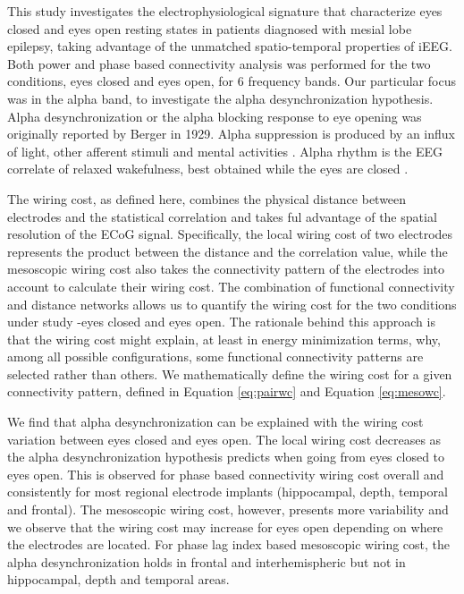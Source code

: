 \documentclass[11pt, onecolumn]{article}
\begin{document}
This study investigates the electrophysiological signature that characterize eyes closed and eyes open resting states in patients  diagnosed with mesial lobe epilepsy, taking advantage of the unmatched spatio-temporal properties of iEEG. Both power and phase based connectivity analysis was performed for the two conditions, eyes closed and eyes open, for 6 frequency bands. Our particular focus was in the alpha band, to investigate the alpha desynchronization hypothesis.
Alpha desynchronization or the alpha blocking response to eye opening was originally reported by Berger in 1929. Alpha suppression is produced by an influx of light, other afferent stimuli and mental activities \citep{schomer2012niedermeyer}. Alpha rhythm is the EEG correlate of relaxed wakefulness, best obtained while the eyes are closed  \citep{niedermeyer2005electroencephalography}. 
 
The wiring cost, as defined here, combines the physical distance between electrodes and the statistical correlation and takes ful advantage of the spatial resolution of the ECoG signal. Specifically, the local wiring cost of two electrodes represents the product between the distance and the correlation value, while the mesoscopic wiring cost also takes the connectivity pattern of the electrodes into account to calculate their wiring cost. The combination of functional connectivity and distance networks allows us to quantify the wiring cost for the two conditions under study -eyes closed and eyes open.
The rationale behind this approach is that the wiring cost might explain, at least in energy minimization terms, why, among all possible configurations, some functional connectivity patterns are selected rather than others. We mathematically define the wiring cost for a given connectivity pattern, defined in Equation \ref{eq:pairwc} and Equation \ref{eq:mesowc}. 

We find that alpha desynchronization can be explained with the wiring cost variation between eyes closed and eyes open. The local wiring cost decreases as the alpha desynchronization hypothesis predicts when going from  eyes closed to eyes open. This is observed for phase based connectivity wiring cost overall and consistently for most regional electrode implants (hippocampal, depth, temporal and frontal). The mesoscopic wiring cost, however, presents more variability and we observe that the wiring cost may increase for eyes open depending on where the electrodes are located. For phase lag index based mesoscopic wiring cost, the alpha desynchronization holds in frontal and interhemispheric but not in hippocampal, depth and temporal areas. 
\end{document}
